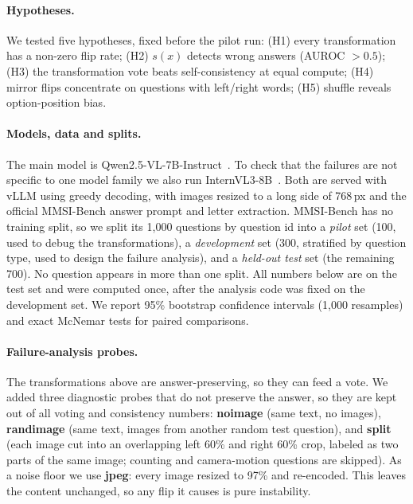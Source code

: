 \paragraph{Hypotheses.}
We tested five hypotheses, fixed before the pilot run:
(H1) every transformation has a non-zero flip rate;
(H2) $s(x)$ detects wrong answers (AUROC $>0.5$);
(H3) the transformation vote beats self-consistency at equal compute;
(H4) mirror flips concentrate on questions with left/right words;
(H5) shuffle reveals option-position bias.

\paragraph{Models, data and splits.}
The main model is Qwen2.5-VL-7B-Instruct~\citep{bai2025qwen25vl}. To check that the failures are
not specific to one model family we also run InternVL3-8B~\citep{zhu2025internvl3}. Both are
served with vLLM using greedy decoding, with images resized to a long side of 768\,px and the
official MMSI-Bench answer prompt and letter extraction. MMSI-Bench has no training split, so we
split its 1{,}000 questions by question id into a \emph{pilot} set (100, used to debug the
transformations), a \emph{development} set (300, stratified by question type, used to design the
failure analysis), and a \emph{held-out test} set (the remaining 700). No question appears in
more than one split. All numbers below are on the test set and were computed once, after the
analysis code was fixed on the development set. We report 95\% bootstrap confidence intervals
(1{,}000 resamples) and exact McNemar tests for paired comparisons.

\paragraph{Failure-analysis probes.}
The transformations above are answer-preserving, so they can feed a vote. We added three
diagnostic probes that do not preserve the answer, so they are kept out of all voting and
consistency numbers:
\textbf{noimage} (same text, no images),
\textbf{randimage} (same text, images from another random test question), and
\textbf{split} (each image cut into an overlapping left 60\% and right 60\% crop, labeled as two
parts of the same image; counting and camera-motion questions are skipped).
As a noise floor we use \textbf{jpeg}: every image resized to 97\% and re-encoded. This leaves
the content unchanged, so any flip it causes is pure instability.

